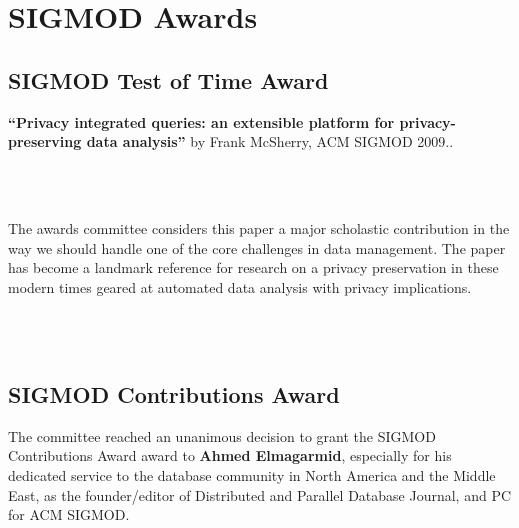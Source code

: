 
\newcommand{\personphoto}[1]{{\texttt{[image: \#1]}}}
\newcommand{\awardedpaper}[2]{ {\centering \textbf{``#1''}} by {\centering #2.}}
\newcommand{\quot}[2]{{\vspace{2mm}``\emph{#1}''}}


\clearpage


\ifodd\value{page}\hbox{}\newpage\fi


\section{SIGMOD Awards}

\subsection*{SIGMOD Test of Time Award}

\awardedpaper{Privacy integrated queries: an extensible platform for privacy-preserving data analysis}{Frank McSherry, ACM SIGMOD 2009}.

~\\~

The awards committee considers this paper a major scholastic contribution
in the way we should handle one of the core challenges in  data management. The paper
has become a landmark reference for research on a privacy preservation in these modern
times geared at automated data analysis with privacy implications.


~\\~


\clearpage

\subsection*{SIGMOD Contributions Award}

The committee reached an unanimous decision to  grant the SIGMOD Contributions Award award to \textbf{Ahmed Elmagarmid}, especially for his dedicated service to the database community in North America and the Middle East, as the founder/editor of Distributed and Parallel Database Journal, and PC for ACM SIGMOD.


